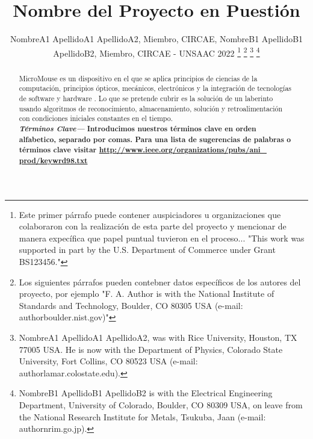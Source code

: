 \documentclass[a4paper]{IEEEtran} %
\providecommand{\keywords}[1]{\textbf{\textit{Términos Clave---}} #1}
\begin{document}

\title{Nombre del Proyecto en Puestión}
\author{NombreA1 ApellidoA1 ApellidoA2, Miembro, CIRCAE, NombreB1 ApellidoB1 ApellidoB2, Miembro, CIRCAE - UNSAAC 2022
\thanks{Este primer párrafo puede contener auspiciadores u organizaciones que colaboraron con la realización de esta parte del proyecto y mencionar de manera expecífica que papel puntual tuvieron en el proceso... "This work was supported in part by the U.S. Department of Commerce under Grant BS123456."}
\thanks{Los siguientes párrafos pueden contebner datos específicos de los autores del proyecto, por ejemplo "F. A. Author is with the National Institute of Standards and Technology, Boulder, CO 80305 USA (e-mail: author\@ boulder.nist.gov)"}
\thanks{NombreA1 ApellidoA1 ApellidoA2, was with Rice University, Houston, TX 77005 USA. He is now with the Department of Physics, Colorado State University, Fort Collins, CO 80523 USA (e-mail: author\@ lamar.colostate.edu).}
\thanks{NombreB1 ApellidoB1 ApellidoB2 is with the Electrical Engineering Department, University of Colorado, Boulder, CO 80309 USA, on leave from the National Research Institute for Metals, Tsukuba, Jaan (e-mail: author\@ nrim.go.jp).}}

\maketitle


\begin{abstract}
MicroMouse es un dispositivo en el que se aplica principios de ciencias de la computación, principios ópticos, mecánicos, electrónicos y la integración de tecnologías de software y hardware  . Lo que se pretende cubrir es la solución de un laberinto usando algoritmos de reconocimiento, almacenamiento, solución y retroalimentación con condiciones iniciales constantes en el tiempo.\\

\keywords{\textbf{Introducimos nuestros términos clave en orden alfabetico, separado por comas. Para una lista de sugerencias de palabras o términos clave visitar \underline{http://www.ieee.org/organizations/pubs/ani\_ prod/keywrd98.txt}}}
\end{abstract}

\end{document}
